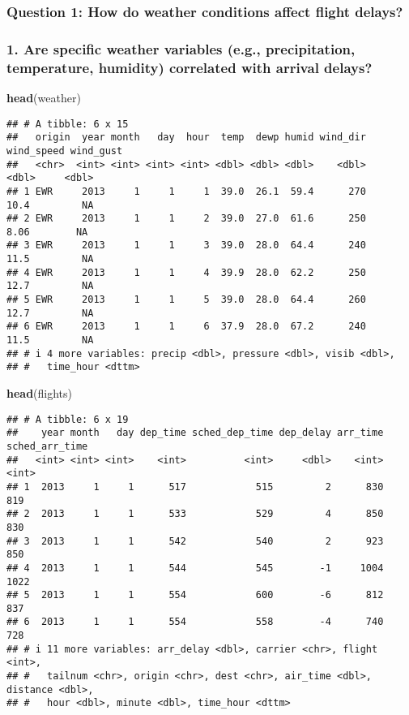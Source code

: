 \documentclass[
]{article}
\newenvironment{Shaded}{\begin{snugshade}}{\end{snugshade}}
\newcommand{\FunctionTok}[1]{\textcolor[rgb]{0.13,0.29,0.53}{\textbf{#1}}}
\newcommand{\NormalTok}[1]{#1}
\begin{document}
\subsubsection{Question 1: How do weather conditions affect flight
delays?}\label{question-1-how-do-weather-conditions-affect-flight-delays}

\subsubsection{1. Are specific weather variables (e.g., precipitation,
temperature, humidity) correlated with arrival
delays?}\label{are-specific-weather-variables-e.g.-precipitation-temperature-humidity-correlated-with-arrival-delays}

\begin{Shaded}
\begin{Highlighting}[]
\FunctionTok{head}\NormalTok{(weather)}
\end{Highlighting}
\end{Shaded}

\begin{verbatim}
## # A tibble: 6 x 15
##   origin  year month   day  hour  temp  dewp humid wind_dir wind_speed wind_gust
##   <chr>  <int> <int> <int> <int> <dbl> <dbl> <dbl>    <dbl>      <dbl>     <dbl>
## 1 EWR     2013     1     1     1  39.0  26.1  59.4      270      10.4         NA
## 2 EWR     2013     1     1     2  39.0  27.0  61.6      250       8.06        NA
## 3 EWR     2013     1     1     3  39.0  28.0  64.4      240      11.5         NA
## 4 EWR     2013     1     1     4  39.9  28.0  62.2      250      12.7         NA
## 5 EWR     2013     1     1     5  39.0  28.0  64.4      260      12.7         NA
## 6 EWR     2013     1     1     6  37.9  28.0  67.2      240      11.5         NA
## # i 4 more variables: precip <dbl>, pressure <dbl>, visib <dbl>,
## #   time_hour <dttm>
\end{verbatim}

\begin{Shaded}
\begin{Highlighting}[]
\FunctionTok{head}\NormalTok{(flights)}
\end{Highlighting}
\end{Shaded}

\begin{verbatim}
## # A tibble: 6 x 19
##    year month   day dep_time sched_dep_time dep_delay arr_time sched_arr_time
##   <int> <int> <int>    <int>          <int>     <dbl>    <int>          <int>
## 1  2013     1     1      517            515         2      830            819
## 2  2013     1     1      533            529         4      850            830
## 3  2013     1     1      542            540         2      923            850
## 4  2013     1     1      544            545        -1     1004           1022
## 5  2013     1     1      554            600        -6      812            837
## 6  2013     1     1      554            558        -4      740            728
## # i 11 more variables: arr_delay <dbl>, carrier <chr>, flight <int>,
## #   tailnum <chr>, origin <chr>, dest <chr>, air_time <dbl>, distance <dbl>,
## #   hour <dbl>, minute <dbl>, time_hour <dttm>
\end{verbatim}
\end{document}
